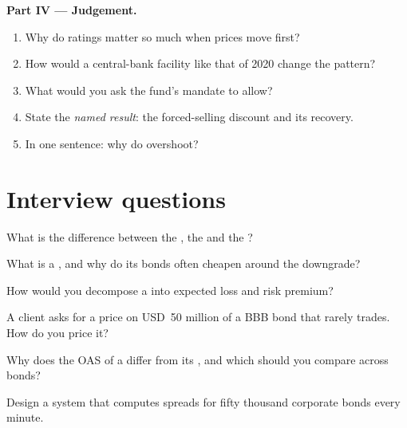 \begin{problem}
\medskip\noindent\textbf{Part IV --- Judgement.}
\begin{enumerate}[resume]
\item Why do ratings matter so much when prices move first?
\item How would a central-bank facility like that of 2020 change the pattern?
\item What would you ask the fund's mandate to allow?
\item State the \emph{named result}: the forced-selling discount and its recovery.
\item In one sentence: why do  overshoot?
\end{enumerate}
\end{problem}

\section{Interview questions}

\begin{interviewq}\label{iq:m2:corporate-bonds:1}
What is the difference between the , the  and the ?
\end{interviewq}

\begin{interviewq}\label{iq:m2:corporate-bonds:2}
What is a , and why do its bonds often cheapen around the downgrade?
\end{interviewq}

\begin{interviewq}\label{iq:m2:corporate-bonds:3}
How would you decompose a  into expected loss and risk premium?
\end{interviewq}

\begin{interviewq}\label{iq:m2:corporate-bonds:4}
A client asks for a price on USD~50 million of a BBB bond that rarely trades. How do
you price it?
\end{interviewq}

\begin{interviewq}\label{iq:m2:corporate-bonds:5}
Why does the OAS of a  differ from its , and which should you
compare across bonds?
\end{interviewq}

\begin{interviewq}\label{iq:m2:corporate-bonds:6}
Design a system that computes spreads for fifty thousand corporate bonds every minute.
\end{interviewq}
